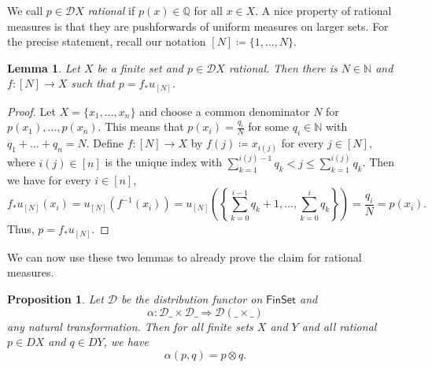\documentclass[11pt,a4paper]{scrartcl}
\newcommand{\finset}{\mathsf{FinSet}}
\newcommand{\N}{\mathbb{N}}
\newcommand{\Q}{\mathbb{Q}}
\newcommand{\finiteset}[1]{[#1]}	%
\newcommand{\dist}{\mathcal{D}}
\newtheorem{prop}[theo]{Proposition}
\newtheorem{lem}[theo]{Lemma}
\theoremstyle{definition}
\begin{document}
We call $p \in \dist X$ \emph{rational} if $p(x) \in \Q$ for all $x \in X$. A nice property of rational measures is that they are pushforwards of uniform measures on larger sets.
For the precise statement, recall our notation $[N] \coloneqq \{1, \ldots, N\}$.

\begin{lem}\label{lem:rationalmeasure}
  Let $X$ be a finite set and $p \in \dist X$ rational. Then there is $N \in \N$ and $f:\finiteset{N} \rightarrow X$ such that $p = f_\ast u_{\finiteset{N}}$.
\end{lem}
\begin{proof}
  Let $X = \{x_1, \ldots, x_n\}$ and choose a common denominator $N$ for $p(x_1), \ldots, p(x_n)$.
  This means that $p(x_i) = \frac{q_i}{N}$ for some $q_i \in \N$ with $q_1 + \ldots + q_n = N$.
  Define $f: \finiteset{N}  \rightarrow X$ by $f(j) \coloneqq x_{i(j)}$ for every $j \in [N]$,
  where $i(j) \in [n]$ is the unique index with $\sum_{k=1}^{i(j)-1}q_k < j \leq \sum_{k=1}^{i(j)} q_k$.
  Then we have for every $i \in [n]$,
  \[
    f_\ast u_{\finiteset{N}}(x_i) = u_{\finiteset{N}}(f^{-1}(x_i)) =  u_{\finiteset{N}} \left(\left\{\sum_{k=0}^{i-1} q_k + 1,\ldots, \sum_{k=0}^i q_k\right\}\right) = \frac{q_i}{N} = p(x_i).
  \]
  Thus, $p = f_\ast u_{\finiteset{N}}$.
\end{proof}

We can now use these two lemmas to already prove the claim for rational measures.

\begin{prop}\label{prop:rationalcase}
  Let $\dist$ be the distribution functor on $\finset$ and
  \begin{equation}
    \label{eq:alpha}
    \alpha: \dist \_ \times \dist \_ \Rightarrow \dist(\_ \times \_)
  \end{equation}
  any natural transformation.
  Then for all finite sets $X$ and $Y$ and all rational $p \in DX$ and $q \in DY$, we have
  \[
    \alpha(p,q) = p \otimes q.
  \]
\end{prop}
\end{document}
